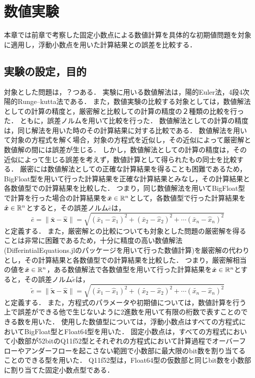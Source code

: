 \chapter{数値実験}
\label{chap:数値実験}
本章では前章で考察した固定小数点による数値計算を具体的な初期値問題を対象に適用し，浮動小数点を用いた計算結果との誤差を比較する．
\section{実験の設定，目的}
対象とした問題は，？つある．
実験に用いる数値解法は，陽的Euler法，4段4次陽的Runge--kutta法である．
また，数値実験の比較する対象としては，数値解法としての計算の精度と，厳密解と比較しての計算の精度の２種類の比較を行った．
ともに，誤差ノルムを用いて比較を行った．
数値解法としての計算の精度は，同じ解法を用いた時のその計算結果に対する比較である．
数値解法を用いて対象の方程式を解く場合，対象の方程式を近似し，その近似によって厳密解と数値解の間には誤差が生じる．
しかし，数値解法としての計算の精度は，その近似によって生じる誤差を考えず，数値計算として得られたもの同士を比較する．
厳密には数値解法としての正確な計算結果を得ることも困難であるため，BigFloat型を用いて行った計算結果を正確な計算結果とみなし，その計算結果と各数値型での計算結果を比較した．
つまり，同じ数値解法を用いてBigFloat型で計算を行った場合の計算結果を$\bar{\bm{x}} \in \mathbb{R}^n$として，各数値型で行った計算結果を$\hat{\bm{x}} \in \mathbb{R}^n$とすると，その誤差ノルム$\bar{e}$は，
\begin{equation}
    \bar{e} = \|\bar{\bm{x}} - \hat{\bm{x}}\| = \sqrt{(\bar{x}_1 - \hat{x}_1)^2 + (\bar{x}_2 - \hat{x}_2)^2 + \cdots (\bar{x}_n - \hat{x}_n)^2}
\end{equation}
と定義する．
また，厳密解との比較についても対象とした問題の厳密解を得ることは非常に困難であるため，十分に精度の高い数値解法(DifferintialEquations.jlのパッケージを用いて行った数値計算)を厳密解の代わりとし，その計算結果と各数値型での計算結果を比較した．
つまり，厳密解相当の値を$\tilde{\bm{x}} \in \mathbb{R}^n$，ある数値解法で各数値型を用いて行った計算結果を$\hat{\bm{x}} \in \mathbb{R}^n$とすると，その誤差ノルム$\tilde{e}$は，
\begin{equation}
   \tilde{e}  = \|\tilde{\bm{x}} - \hat{\bm{x}}\| = \sqrt{(\tilde{x_1} - \hat{x}_1)^2 + (\tilde{x_2} - \hat{x}_2)^2 + \cdots (\tilde{x_n} - \hat{x}_n)^2}
\end{equation}
と定義する．
また，方程式のパラメータや初期値については，数値計算を行う上で誤差ができる他で生じないように2進数を用いて有限の桁数で表すことのできる数を用いた．
使用した数値型については，浮動小数点はすべての方程式においてBigFloat型とFloat64型を用いた．
固定小数点は，すべての方程式において小数部が52bitのQ11f52型とそれぞれの方程式において計算過程でオーバーフローやアンダーフローを起こさない範囲で小数部に最大限のbit数を割り当てることのできる型を用いた．
Q11f52型は，Float64型の仮数部と同じbit数を小数部に割り当てた固定小数点型である．
